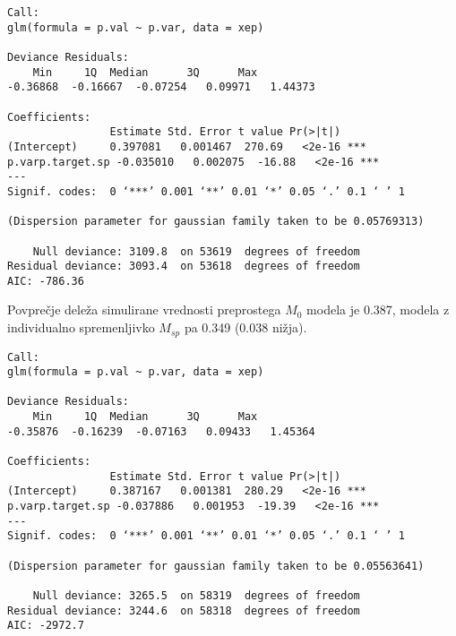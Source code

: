 \begin{verbatim}
Call:
glm(formula = p.val ~ p.var, data = xep)

Deviance Residuals:
 	Min    	1Q	Median    	3Q   	Max
-0.36868  -0.16667  -0.07254   0.09971   1.44373

Coefficients:
              	Estimate Std. Error t value Pr(>|t|)
(Intercept)   	0.397081   0.001467  270.69   <2e-16 ***
p.varp.target.sp -0.035010   0.002075  -16.88   <2e-16 ***
---
Signif. codes:  0 ‘***’ 0.001 ‘**’ 0.01 ‘*’ 0.05 ‘.’ 0.1 ‘ ’ 1

(Dispersion parameter for gaussian family taken to be 0.05769313)

	Null deviance: 3109.8  on 53619  degrees of freedom
Residual deviance: 3093.4  on 53618  degrees of freedom
AIC: -786.36
\end{verbatim}

Povprečje deleža simulirane vrednosti preprostega $M_0$ modela je 0.387, modela z individualno spremenljivko $M_{sp}$ pa 0.349 (0.038 nižja).

\begin{verbatim}
Call:
glm(formula = p.val ~ p.var, data = xep)

Deviance Residuals:
 	Min    	1Q	Median    	3Q   	Max
-0.35876  -0.16239  -0.07163   0.09433   1.45364

Coefficients:
              	Estimate Std. Error t value Pr(>|t|)
(Intercept)   	0.387167   0.001381  280.29   <2e-16 ***
p.varp.target.sp -0.037886   0.001953  -19.39   <2e-16 ***
---
Signif. codes:  0 ‘***’ 0.001 ‘**’ 0.01 ‘*’ 0.05 ‘.’ 0.1 ‘ ’ 1

(Dispersion parameter for gaussian family taken to be 0.05563641)

	Null deviance: 3265.5  on 58319  degrees of freedom
Residual deviance: 3244.6  on 58318  degrees of freedom
AIC: -2972.7
\end{verbatim}

